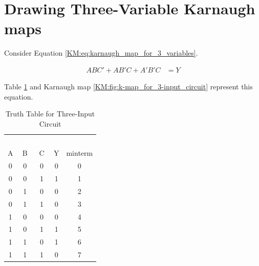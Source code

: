 \section{Drawing Three-Variable Karnaugh maps}
\label{KM:sec:drawing_3-variable_karnaugh_maps}

Consider Equation \ref{KM:eq:karnaugh_map_for_3_variables}.

\begin{align}
  \label{KM:eq:karnaugh_map_for_3_variables}
  ABC'+AB'C+A'B'C &= Y
\end{align}

Table \ref{KM:tab:truth_table_for_3-input_circuit} and Karnaugh map \ref{KM:fig:k-map_for_3-input_circuit} represent this equation.

\begin{table}[H]
  \sffamily
  \newcommand{\head}[1]{\textcolor{white}{\textbf{#1}}}    
  \begin{center}
    \begin{tabular}{ccccc} 
      \rowcolor{black!75}
      \multicolumn{3}{c}{\head{Inputs}} & \multicolumn{2}{l}{\head{Output}} \\
      A & B & C & Y & minterm \\
      \hline
      0 & 0 & 0 & 0 & 0 \\
      0 & 0 & 1 & 1 & 1 \\
      0 & 1 & 0 & 0 & 2 \\
      0 & 1 & 1 & 0 & 3 \\ 
      1 & 0 & 0 & 0 & 4 \\
      1 & 0 & 1 & 1 & 5 \\
      1 & 1 & 0 & 1 & 6 \\
      1 & 1 & 1 & 0 & 7  
    \end{tabular}
  \end{center}
  \caption{Truth Table for Three-Input Circuit}
  \label{KM:tab:truth_table_for_3-input_circuit}
\end{table}

